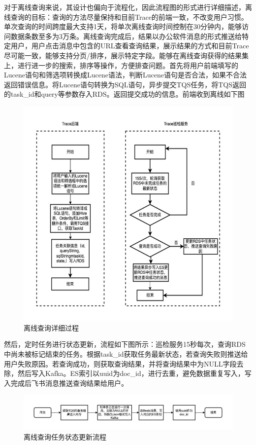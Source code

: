 对于离线查询来说，其设计也偏向于流程化，因此流程图的形式进行详细描述，离线查询的目标：查询的方法尽量保持和目前Trace的前端一致，不改变用户习惯。单次查询的时间跨度最大支持1天，将单次离线查询时间控制在30分钟内，能够访问数据条数至多为3万条。离线查询完成后，结果以办公软件消息的形式推送给特定用户，用户点击消息中包含的URL查看查询结果，展示结果的方式和目前Trace尽可能一致，能够支持分页/排序，展示特定字段。能够在离线查询获得的结果集上，进行进一步的搜索，排序等操作，方便排查问题。首先将用户前端填写的Lucene语句和筛选项转换成Lucene语法，判断Lucene语句是否合法，如果不合法返回错误信息。将Lucene语句转换为SQL语句，异步提交TQS任务，将TQS返回的task\_id和query等参数存入RDS。返回提交成功的信息。前端收到离线如下图 
    \begin{figure}[htb]
  \centering
  \includegraphics[width=5in]{figure/chapter4/离线查询详细过程.jpg}
  \caption{离线查询详细过程}\label{lixianxiangxi}
\end{figure}

然后，定时任务进行状态更新，流程如下图所示：巡检服务15秒每次，查询RDS中尚未被标记结束的任务。根据task\_id获取任务最新状态，若查询失败则推送给用户失败原因。若查询成功，则获取查询结果，并将查询结果中为NULL字段去除，然后写入Kafka。ES索引以uuid为doc\_id，进行去重，避免数据重复写入，写入完成后飞书消息推送查询结果给用户。

    \begin{figure}[htb]
  \centering
  \includegraphics[width=5in]{figure/chapter4/离线查询任务状态更新流程.jpg}
  \caption{离线查询任务状态更新流程}\label{lixianxiangxi}
\end{figure}

